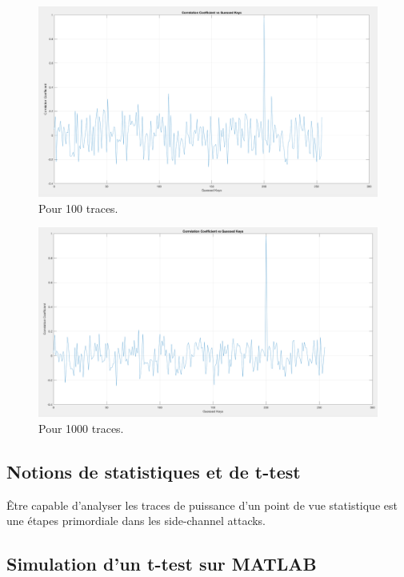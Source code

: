 \documentclass[10pt, oneside, a4paper]{article}
\begin{document}
\begin{figure}[htbp]
    \centering
    \includegraphics[width=1.05\textwidth]{image/100}    \caption{Pour 100 traces.}    \label{fig:100}
\end{figure}

\begin{figure}[htbp]
    \centering
    \includegraphics[width=1.05\textwidth]{image/1000}    \caption{Pour 1000 traces.}    \label{fig:1000}
\end{figure}


\newpage

\subsection{Notions de statistiques et de t-test}

Être capable d'analyser les traces de puissance d'un point de vue statistique est une étapes primordiale dans les side-channel attacks.

\subsection{Simulation d'un t-test sur MATLAB}
\end{document}
